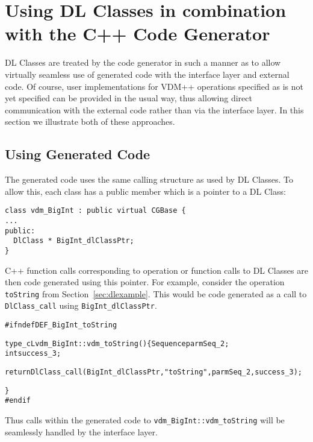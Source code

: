 \documentclass[\pformat,12pt]{article}
\begin{document}
\section{Using DL Classes in combination with the C++ Code Generator}\label{sec:codegen}

DL Classes are treated by the code generator in such a manner as to
allow virtually seamless use of generated code with the interface
layer and external code. Of course, user implementations for VDM++
operations specified as \textsf{is not yet specified} can be provided
in the usual way, thus allowing direct communication with the external
code rather than via the interface layer. In this section we
illustrate both of these approaches.

\subsection{Using Generated Code}

The generated code uses the same calling structure as used by DL
Classes. To allow this, each class has a public member which is a
pointer to a DL Class:
\begin{verbatim}
class vdm_BigInt : public virtual CGBase {
...
public:
  DlClass * BigInt_dlClassPtr;
}
\end{verbatim}
C++ function calls corresponding to operation or function calls to DL
Classes are then code generated using this pointer. For example,
consider the operation \texttt{toString} from
Section~\ref{sec:dlexample}. This would be code generated as a call to
\texttt{DlClass\_call} using \texttt{BigInt\_dlClassPtr}.
\begin{alltt}
\#ifndef DEF_BigInt_toString
 
type_cL vdm_BigInt::vdm_toString () \{  Sequence parmSeq_2;
  int success_3;
 
  return DlClass_call(BigInt_dlClassPtr, "toString", parmSeq_2, success_3);
 
\}
\#endif   
\end{alltt}
Thus calls within the generated code to
\texttt{vdm\_BigInt::vdm\_toString} will be seamlessly handled by the
interface layer.
\end{document}
